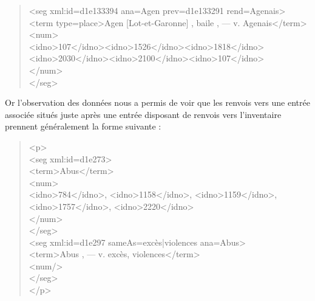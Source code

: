 \documentclass[a4paper,12pt,twoside]{book}
\begin{document}
	\begin{quotation}
               <seg xml:id=\textquotesingle d1e133394\textquotesingle{} ana=\textquotesingle Agen\textquotesingle{} prev=\textquotesingle d1e133291\textquotesingle{} rend=\textquotesingle Agenais\textquotesingle >\\
				\indent\indent<term type=\textquotesingle place\textquotesingle >Agen [Lot-et-Garonne] , baile , — v. Agenais</term>\\
				\indent{}\\
				\indent\indent\indent<idno>107</idno><idno>1526</idno><idno>1818</idno>\\
				\indent\indent\indent<idno>2030</idno><idno>2100</idno><idno>107</idno>\\
				\indent\indent</num>\\
				\indent</seg>
	\end{quotation}

	\noindent Or l'observation des données nous a permis de voir que les renvois vers une entrée associée situés juste après une entrée disposant de renvois vers l'inventaire prennent généralement la forme suivante :
	
	\pagebreak
	
	\begin{quotation}
            <p>\\
			\indent\indent<seg xml:id=\textquotesingle d1e273\textquotesingle >\\
			\indent\indent\indent<term>Abus</term>\\
			\indent\indent\indent<num>\\
			\indent\indent\indent\indent<idno>784</idno>, <idno>1158</idno>, <idno>1159</idno>,\\ 
			\indent\indent\indent\indent<idno>1757</idno>, <idno>2220</idno>\\
			\indent\indent\indent</num>\\
			\indent\indent</seg>\\
			\indent\indent<seg xml:id=\textquotesingle d1e297\textquotesingle{} sameAs=\textquotesingle excès|violences\textquotesingle{} ana=\textquotesingle Abus\textquotesingle >\\
			\indent\indent\indent<term>Abus , — v. excès, violences</term>\\
			\indent\indent\indent<num/>\\
			\indent\indent</seg>\\
			\indent</p>
	\end{quotation}
	
\end{document}
